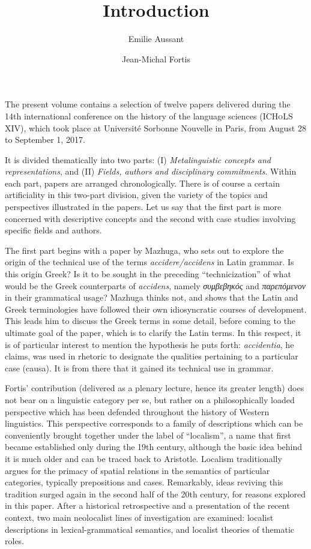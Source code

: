 \documentclass[output=paper]{langsci/langscibook}
\title{Introduction}
\author{Emilie Aussant\affiliation{Histoire des Théories Linguistiques (CNRS/Université de Paris)}\and Jean-Michal Fortis\affiliation{Histoire des Théories Linguistiques (CNRS/Université de Paris)}}
\begin{document}
\maketitle

The present volume contains a selection of twelve papers delivered during the 14th international conference on the history of the language sciences (\textsc{ICHoLS XIV}), which took place at Université Sorbonne Nouvelle in Paris, from August 28 to September 1, 2017.

It is divided thematically into two parts: (I) \emph{Metalinguistic concepts and representations}, and (II) \emph{Fields, authors and disciplinary commitments}. Within each part, papers are arranged chronologically. There is of course a certain artificiality in this two-part division, given the variety of the topics and perspectives illustrated in the papers. Let us say that the first part is more concerned with descriptive concepts and the second with case studies involving specific fields and authors.

The first part begins with a paper by Mazhuga, who sets out to explore the origin of the technical use of the terms \emph{accidere\slash accidens} in Latin grammar. Is this origin Greek? Is it to be sought in the preceding ``technicization'' of what would be the Greek counterparts of \emph{accidens}, namely \textit{συμβεβηκός} and \textit{παρεπόμενον} in their grammatical usage? Mazhuga thinks not, and shows that the Latin and Greek terminologies have followed their own idiosyncratic courses of development. This leads him to discuss the Greek terms in some detail, before coming to the ultimate goal of the paper, which is to clarify the Latin terms. In this respect, it is of particular interest to mention the hypothesis he puts forth: \emph{accidentia}, he claims, was used in rhetoric to designate the qualities pertaining to a particular case (causa). It is from there that it gained its technical use in grammar.

Fortis' contribution (delivered as a plenary lecture, hence its greater length) does not bear on a linguistic category per se, but rather on a philosophically loaded perspective which has been defended throughout the history of Western linguistics. This perspective corresponds to a family of descriptions which can be conveniently brought together under the label of ``localism'', a name that first became established only during the 19th century, although the basic idea behind it is much older and can be traced back to Aristotle. Localism traditionally argues for the primacy of spatial relations in the semantics of particular categories, typically prepositions and cases. Remarkably, ideas reviving this tradition surged again in the second half of the 20th century, for reasons explored in this paper. After a historical retrospective and a presentation of the recent context, two main neolocalist lines of investigation are examined: localist descriptions in lexical-grammatical semantics, and localist theories of thematic roles.
\end{document}
